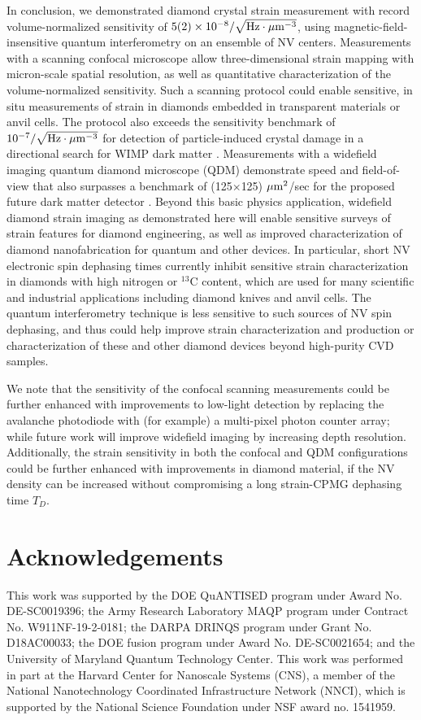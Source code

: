\documentclass[reprint,superscriptaddress,hyphens,amsmath,amssymb,aps,prx,float]{revtex4-2}
\begin{document}
In conclusion, we demonstrated diamond crystal strain measurement with record volume-normalized sensitivity of $5(2)\times10^{-8}/\sqrt{\rm Hz \cdot \mu m^{-3}}$, using magnetic-field-insensitive quantum interferometry on an ensemble of NV centers.  Measurements with a scanning confocal microscope allow three-dimensional strain mapping with micron-scale spatial resolution, as well as quantitative characterization of the volume-normalized sensitivity.  Such a scanning protocol could enable sensitive, in situ measurements of strain in diamonds embedded in transparent materials or anvil cells.  The protocol also exceeds the sensitivity benchmark of $10^{-7}/\sqrt{\rm{Hz \cdot \mu m^{-3}}}$ for detection of particle-induced crystal damage in a directional search for WIMP dark matter \cite{MarshallQST2021}.  Measurements with a widefield imaging quantum diamond microscope (QDM) demonstrate speed and field-of-view that also surpasses a benchmark of (125$\times$125) $\rm{\mu m^2}$/sec for the proposed future dark matter detector \cite{MarshallQST2021}.  Beyond this basic physics application, widefield diamond strain imaging as demonstrated here will enable sensitive surveys of strain features for diamond engineering, as well as improved characterization of diamond nanofabrication for quantum and other devices.  In particular, short NV electronic spin dephasing times currently inhibit sensitive strain characterization in diamonds with high nitrogen or $^{13}$C content, which are used for many scientific and industrial applications including diamond knives and anvil cells.  The quantum interferometry technique is less sensitive to such sources of NV spin dephasing, and thus could help improve strain characterization and production or characterization of these and other diamond devices beyond high-purity CVD samples.

We note that the sensitivity of the confocal scanning measurements could be further enhanced with improvements to low-light detection by replacing the avalanche photodiode with (for example) a multi-pixel photon counter array; while future work will improve widefield imaging by increasing depth resolution.  Additionally, the strain sensitivity in both the confocal and QDM configurations could be further enhanced with improvements in diamond material, if the NV density can be increased without compromising a long strain-CPMG dephasing time $T_D$.

\section{Acknowledgements}
This work was supported by the DOE QuANTISED program under Award No. DE-SC0019396; the Army Research Laboratory MAQP program under Contract No. W911NF-19-2-0181; the DARPA DRINQS program under Grant No. D18AC00033; the DOE fusion program under Award No. DE-SC0021654; and the University of Maryland Quantum Technology Center.  This work was performed in part at the Harvard Center for Nanoscale Systems (CNS), a member of the National Nanotechnology Coordinated Infrastructure Network (NNCI), which is  supported by  the  National  Science  Foundation  under NSF award no. 1541959.  
\end{document}
